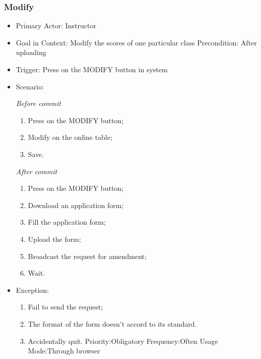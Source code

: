 \documentclass[a4]{article}
\begin{document}
\subsubsection{Modify}
\begin{itemize}
\item Primary Actor: Instructor
\item Goal in Context: Modify the scores of one particular class
Precondition: After uploading
\item Trigger: Press on the MODIFY button in system
\item Scenario:

\emph{Before commit}
\begin{enumerate}
\item Press on the MODIFY button;
\item Modify on the online table;
\item Save.
\end{enumerate}
\emph{After commit}
\begin{enumerate}
\item Press on the MODIFY button;
\item Download an application form;
\item Fill the application form;
\item Upload the form;
\item Broadcast the request for amendment;
\item Wait.
\end{enumerate}
\item Exception:
\begin{enumerate}
\item Fail to send the request;
\item The format of the form doesn’t accord to its standard.
\item Accidentally quit.
Priority:Obligatory
Frequency:Often
Usage Mode:Through browser
\end{enumerate}
\end{itemize}
\end{document}
